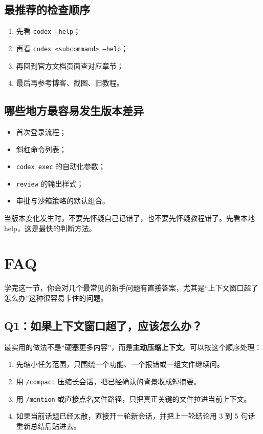 \documentclass[UTF8,a4paper,12pt]{ctexart}
\begin{document}
\subsection{最推荐的检查顺序}

\begin{enumerate}
  \item 先看 \texttt{codex --help}；
  \item 再看 \texttt{codex <subcommand> --help}；
  \item 再回到官方文档页面查对应章节；
  \item 最后再参考博客、截图、旧教程。
\end{enumerate}

\subsection{哪些地方最容易发生版本差异}

\begin{itemize}
  \item 首次登录流程；
  \item 斜杠命令列表；
  \item \texttt{codex exec} 的自动化参数；
  \item \texttt{review} 的输出样式；
  \item 审批与沙箱策略的默认组合。
\end{itemize}

\begin{sumbox}
当版本变化发生时，不要先怀疑自己记错了，也不要先怀疑教程错了。先看本地 help，这是最快的判断方法。
\end{sumbox}

\section{FAQ}

\begin{learnbox}
学完这一节，你会对几个最常见的新手问题有直接答案，尤其是“上下文窗口超了怎么办”这种很容易卡住的问题。
\end{learnbox}

\subsection{Q1：如果上下文窗口超了，应该怎么办？}

最实用的做法不是“硬塞更多内容”，而是\textbf{主动压缩上下文}。可以按这个顺序处理：
\begin{enumerate}
  \item 先缩小任务范围，只围绕一个功能、一个报错或一组文件继续问。
  \item 用 \texttt{/compact} 压缩长会话，把已经确认的背景收成短摘要。
  \item 用 \texttt{/mention} 或直接点名文件路径，只把真正关键的文件拉进当前上下文。
  \item 如果当前话题已经太散，直接开一轮新会话，并把上一轮结论用 3 到 5 句话重新总结后贴进去。
\end{enumerate}
\end{document}
